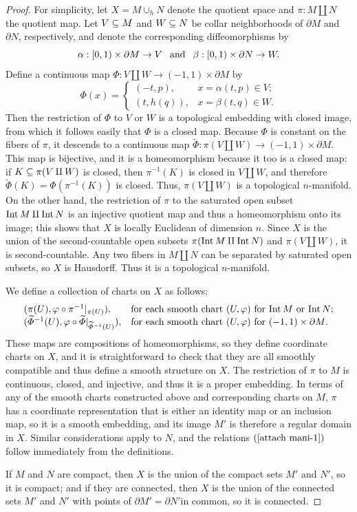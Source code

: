 \begin{proof}
For simplicity, let $X=M\cup_hN$ denote the quotient space and $\pi:M\amalg N$ the quotient map. Let $V\subseteq M$ and $W\subseteq N$ be collar neighborhoods of $\partial M$ and $\partial N$, respectively, and denote the corresponding diffeomorphisms by 
\[\alpha:[0,1)\times\partial M\to V\hspace{8pt}\text{and}\hspace{8pt}\beta:[0,1)\times\partial N\to W.\] 
Define a continuous map $\varPhi:V\amalg W\to(-1,1)\times\partial M$ by
\[\varPhi(x)=\begin{cases}
(-t,p),&x=\alpha(t,p)\in V;\\
(t,h(q)),&x=\beta(t,q)\in W.
\end{cases}\]
Then the restriction of $\varPhi$ to $V$ or $W$ is a topological embedding with closed image, from which it follows easily that $\varPhi$ is a closed map. Because $\varPhi$ is constant on the fibers of $\pi$, it descends to a continuous map $\widetilde{\varPhi}:\pi(V\amalg W)\to(-1,1)\times\partial M$. This map is bijective, and it is a homeomorphism because it too is a closed map: if $K\subseteq\pi(V\amalg W)$ is closed, then $\pi^{-1}(K)$ is closed in $V\amalg W$, and therefore $\widetilde{\varPhi}(K)=\varPhi(\pi^{-1}(K))$ is closed. Thus, $\pi(V\amalg W)$ is a topological $n$-manifold. On the other hand, the restriction of $\pi$ to the saturated open subset $\mathrm{Int}\, M\amalg\mathrm{Int}\, N$ is an injective quotient map and thus a homeomorphism onto its image; this shows that $X$ is locally Euclidean of dimension $n$. Since $X$ is the union of the second-countable open subsets $\pi(\mathrm{Int}\, M\amalg\mathrm{Int}\, N)$ and $\pi(V\amalg W)$, it is second-countable. Any two fibers in $M\amalg N$ can be separated by saturated open subsets, so $X$ is Hausdorff. Thus it is a topological $n$-manifold.\par
We define a collection of charts on $X$ as follows:
\[\begin{array}{ll}
(\pi(U),\varphi\circ\pi^{-1}|_{\pi(U)}),&\text{for each smooth chart $(U,\varphi)$ for $\mathrm{Int}\, M$ or $\mathrm{Int}\, N$};\\
(\widetilde{\varPhi}^{-1}(U),\varphi\circ\widetilde{\varPhi}|_{\widetilde{\varPhi}^{-1}(U)}),&\text{for each smooth chart $(U,\varphi)$ for $(-1,1)\times\partial M$}.
\end{array}\]
These maps are compositions of homeomorphisms, so they define coordinate charts on $X$, and it is straightforward to check that they are all smoothly compatible and thus define a smooth structure on $X$. The restriction of $\pi$ to $M$ is continuous, closed, and injective, and thus it is a proper embedding. In terms of any of the smooth charts constructed above and corresponding charts on $M$, $\pi$ has a coordinate representation that is either an identity map or an inclusion map, so it is a smooth embedding, and its image $M'$ is therefore a regular domain in $X$. Similar considerations apply to $N$, and the relations $(\ref{attach mani-1})$ follow immediately from the definitions.\par
If $M$ and $N$ are compact, then $X$ is the union of the compact sets $M'$ and $N'$, so it is compact; and if they are connected, then $X$ is the union of the connected sets $M'$ and $N'$ with points of $\partial M'=\partial N'$in common, so it is connected.
\end{proof}
